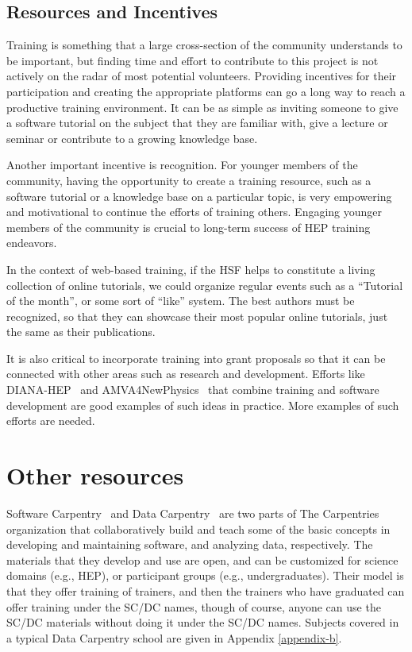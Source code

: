 \documentclass[12pt,a4paper]{article}
\begin{document}
\subsection{Resources and Incentives}

Training is something that a large cross-section of the community
understands to be important, but finding time and effort to contribute to this
project is not actively on the radar of most potential volunteers. Providing
incentives for their participation and creating the appropriate platforms can go
a long way to reach a productive training environment. It can be as simple as
inviting someone to give a software tutorial on the subject that they are
familiar with, give a lecture or seminar or contribute to a growing knowledge
base.

Another important incentive is recognition. For younger members of the
community, having the opportunity to create a training resource, such as a
software tutorial or a knowledge base on a particular topic, is very empowering
and motivational to continue the efforts of training others. Engaging younger
members of the community is crucial to long-term success of HEP training
endeavors.

In the context of web-based training, if the HSF helps to constitute a living
collection of online tutorials, we could organize regular events such as
a ``Tutorial of the month'', or some sort of ``like'' system. The
best authors must be recognized, so that they can showcase their most popular
online tutorials, just the same as their publications.

It is also critical to incorporate training into grant proposals so that it can
be connected with other areas such as research and development. Efforts like
DIANA-HEP~\cite{DIANA-HEP} and AMVA4NewPhysics~\cite{AMVA4NewPhysics}
that combine training
and software development are good examples of such ideas in practice. More
examples of such efforts are needed.


\section{Other resources}

Software Carpentry~\cite{SoftwareCarpentry} and Data
Carpentry~\cite{DataCarpentry} are two parts of The
Carpentries organization that collaboratively build and teach some of the basic
concepts in developing and maintaining software, and analyzing data,
respectively.  The materials that they develop and use are open, and can be
customized for science domains (e.g., HEP), or participant groups (e.g.,
undergraduates). Their model is that they offer training of trainers, and then
the trainers who have graduated can offer training under the SC/DC names, though
of course, anyone can use the SC/DC materials without doing it under the SC/DC
names.
Subjects covered in a typical Data Carpentry school are given in Appendix
\ref{appendix-b}.
\end{document}
